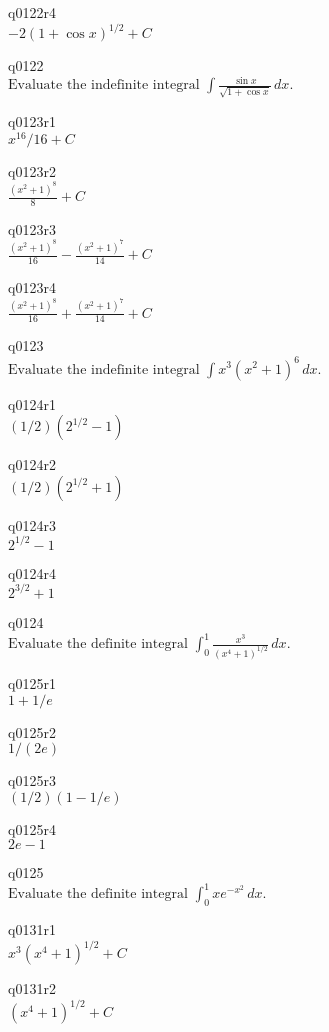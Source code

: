 q0122r4\\
\(\displaystyle -2(1 + \cos x)^{1/2} + C \)

q0122\\
\(\displaystyle \text{Evaluate the indefinite integral } \int \frac{\sin x}{\sqrt{1 + \cos x}}\,dx. \)

q0123r1\\
\(\displaystyle x^{16}/16 + C \)

q0123r2\\
\(\displaystyle \frac{(x^2 + 1)^8}{8} + C \)

q0123r3\\
\(\displaystyle \frac{(x^2 + 1)^8}{16} - \frac{(x^2 + 1)^7}{14} + C \)

q0123r4\\
\(\displaystyle \frac{(x^2 + 1)^8}{16} + \frac{(x^2 + 1)^7}{14} + C \)

q0123\\
\(\displaystyle \text{Evaluate the indefinite integral } \int x^3 (x^2 + 1)^6 \, dx. \)

q0124r1\\
\(\displaystyle (1/2)(2^{1/2} - 1) \)

q0124r2\\
\(\displaystyle (1/2)(2^{1/2} + 1) \)

q0124r3\\
\(\displaystyle 2^{1/2} - 1 \)

q0124r4\\
\(\displaystyle 2^{3/2} + 1 \)

q0124\\
\(\displaystyle \text{Evaluate the definite integral } \int_0^1 \frac{x^3}{(x^4 + 1)^{1/2}}\,dx. \)

q0125r1\\
\(\displaystyle 1 + 1/e \)

q0125r2\\
\(\displaystyle 1/(2e) \)

q0125r3\\
\(\displaystyle (1/2)(1 - 1/e) \)

q0125r4\\
\(\displaystyle 2e - 1 \)

q0125\\
\(\displaystyle \text{Evaluate the definite integral } \int_0^1 xe^{-x^2}\,dx. \)

q0131r1\\
\(\displaystyle x^3(x^4 + 1)^{1/2} + C \)

q0131r2\\
\(\displaystyle (x^4 + 1)^{1/2} + C \)

